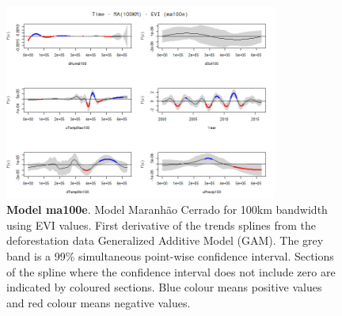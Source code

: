\begin{table}

\begin{figure}[H]
 \centering
        \centering
        \includegraphics[width=0.8\textwidth]{ma100e.png} %
        \caption[Model Cerrado Maranhão for 100km bandwidth using EVI values. First derivative of the trends splines from the deforestation data Generalized Additive Model (GAM)]{\textbf{Model ma100e}. Model Maranhão Cerrado for 100km bandwidth using EVI values. First derivative of the trends splines from the deforestation data Generalized Additive Model (GAM). The grey band is a 99\% simultaneous point-wise confidence interval. Sections of the spline where the confidence interval does not include zero are indicated by coloured sections. Blue colour means positive values and red colour means negative values.}
\end{figure}
\end{table}

